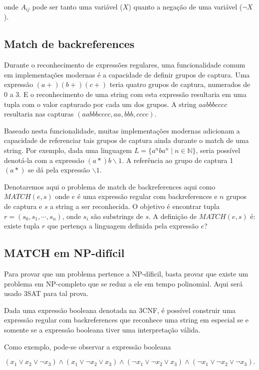 \documentclass[a4paper,12pt,oneside,onecolumn]{uerj}
\begin{document}
onde $A_{ij}$ pode ser tanto uma variável ($X$) quanto a negação de uma variável ($\neg X$).

\subsection{Match de backreferences}

Durante o reconhecimento de expressões regulares, uma funcionalidade comum em implementações modernas é a capacidade de definir grupos de captura. Uma expressão $(a+)(b+)(c+)$ teria quatro grupos de captura, numerados de 0 a 3. E o reconhecimento de uma string com esta expressão resultaria em uma tupla com o valor capturado por cada um dos grupos. A string $aabbbcccc$ resultaria nas capturas $(aabbbcccc, aa, bbb, cccc)$.

Baseado nesta funcionalidade, muitas implementações modernas adicionam a capacidade de referenciar tais grupos de captura ainda durante o match de uma string. Por exemplo, dada uma linguagem $L = \{a^nba^n \mid n \in \mathbb{N}\}$, seria possível denotá-la com a expressão $(a*)b \backslash 1$. A referência ao grupo de captura 1 $(a*)$ se dá pela expressão $\backslash 1$.

Denotaremos aqui o problema de match de backreferences aqui como $MATCH(e, s)$ onde $e$ é uma expressão regular com backreferences e $n$ grupos de captura e $s$ a string a ser reconhecida. O objetivo é encontrar tupla $r = (s_0, s_1, \cdots, s_n)$, onde $s_i$ são substrings de $s$. A definição de $MATCH(e, s)$ é: existe tupla $r$ que pertença a linguagem definida pela expressão $e$?

\subsection{MATCH em NP-difícil}

Para provar que um problema pertence a NP-díficil, basta provar que existe um problema em NP-completo que se reduz a ele em tempo polinomial. Aqui será usado 3SAT para tal prova.

Dada uma expressão booleana denotada na 3CNF, é possível construir uma expressão regular com backreferences que reconhece uma string em especial se e somente se a expressão booleana tiver uma interpretação válida.

Como exemplo, pode-se observar a expressão booleana

\setlength\abovedisplayskip{0pt}
\begin{equation*}
(x_1 \lor x_2 \lor \neg x_3) \wedge 
(x_1 \lor \neg x_2 \lor x_3) \wedge
(\neg x_1 \lor \neg x_2 \lor x_3) \wedge 
(\neg x_1 \lor \neg x_2 \lor \neg x_3).
\end{equation*}
\end{document}
